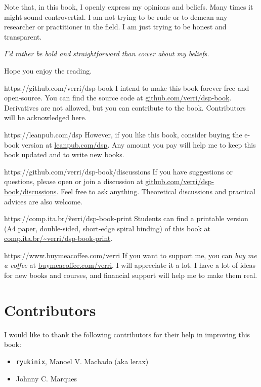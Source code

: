 Note that, in this book, I openly express my opinions and beliefs. Many times it might sound
controvertial.  I am not trying to be rude or to demean any researcher or practitioner in the
field.  I am just trying to be honest and transparent.

\vspace{1em}
\emph{I'd rather be bold and straightforward than cower about my beliefs.}
\vspace{1em}

Hope you enjoy the reading.

\newpage

\begin{parwithqr}{https://github.com/verri/dsp-book}
  I intend to make this book forever free and open-source.  You can find the source code at
  \href{\aurl}{github.com/verri/dsp-book}.  Derivatives are not allowed, but you can
  contribute to the book.  Contributors will be acknowledged here.
\end{parwithqr}

\vfill

\begin{parwithqr}{https://leanpub.com/dsp}
  However, if you like this book, consider buying the e-book version at
  \href{\aurl}{leanpub.com/dsp}.  Any amount you pay will help me to keep this book
  updated and to write new books.
\end{parwithqr}

\vfill

\begin{parwithqr}{https://github.com/verri/dsp-book/discussions}
  If you have suggestions or questions, please open or join a discussion at
  \href{\aurl}{github.com/verri/dsp-book/discussions}.  Feel free to ask anything.
  Theoretical discussions and practical advices are also welcome.
\end{parwithqr}

\vfill

\begin{parwithqr}{https://comp.ita.br/\~verri/dsp-book-print}
  Students can find a printable version (A4 paper, double-sided, short-edge spiral
  binding) of this book at \href{\aurl}{comp.ita.br/\textasciitilde{}verri/dsp-book-print}.
\end{parwithqr}

\vfill

\begin{parwithqr}{https://www.buymeacoffee.com/verri}
  If you want to support me, you can \emph{buy me a coffee} at
  \href{\aurl}{buymeacoffee.com/verri}.  I will appreciate it a lot.
  I have a lot of ideas for new books and courses, and financial support will help me to
  make them real.
\end{parwithqr}

\newpage

\section*{Contributors}

I would like to thank the following contributors for their help in improving this book:

\begin{itemize}
  \itemsep0em
  \item \texttt{ryukinix}, Manoel V. Machado (aka lerax)
  \item Johnny C. Marques
\end{itemize}
